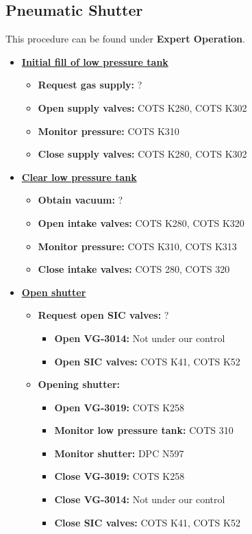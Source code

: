 \subsection{Pneumatic Shutter}
\label{subsubsec:pneumatic_shutter}
This procedure can be found under \textbf{Expert Operation}.
\begin{itemize}
	\item \underline{\textbf{Initial fill of low pressure tank}}
		\begin{itemize}
			\item \textbf{Request gas supply:}  ?
			\item \textbf{Open supply valves:} COTS K280, COTS K302
			\item \textbf{Monitor pressure:} COTS K310
			\item \textbf{Close supply valves:} COTS K280, COTS K302
		\end{itemize}
		
	\item \underline{\textbf{Clear low pressure tank}}
		\begin{itemize}
			\item \textbf{Obtain vacuum:} ?
			\item \textbf{Open intake valves:} COTS K280, COTS K320
			\item \textbf{Monitor pressure:} COTS K310, COTS K313
			\item \textbf{Close intake valves:} COTS 280, COTS 320
		\end{itemize}
	
	\item \underline{\textbf{Open shutter}}
		\begin{itemize}
			\item \textbf{Request open SIC valves:} ?
				\begin{itemize}
					\item \textbf{Open VG-3014:} Not under our control
					\item \textbf{Open SIC valves:} COTS K41, COTS K52
				\end{itemize}
			\item \textbf{Opening shutter:}
				\begin{itemize}
					\item \textbf{Open VG-3019:} COTS K258
					\item \textbf{Monitor low pressure tank:} COTS 310
					\item \textbf{Monitor shutter:} DPC N597
					\item \textbf{Close VG-3019:} COTS K258
					\item \textbf{Close VG-3014:} Not under our control
					\item \textbf{Close SIC valves:} COTS K41, COTS K52
				\end{itemize}
		\end{itemize}
		

\end{itemize}
